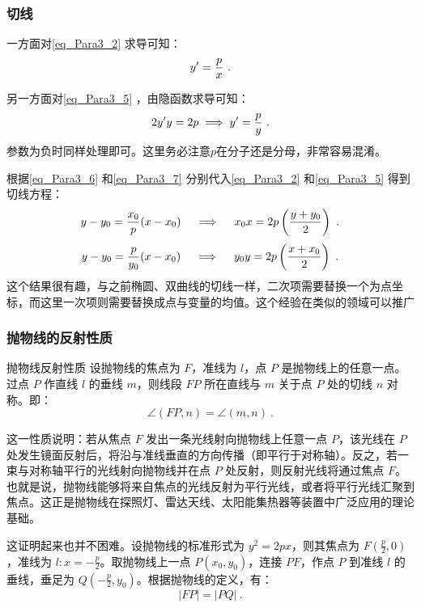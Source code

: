 \subsubsection{切线}

一方面对\autoref{eq_Para3_2} 求导可知：
\begin{equation}\label{eq_Para3_6}
y'={p\over x}~.
\end{equation}

另一方面对\autoref{eq_Para3_5} ，由隐函数求导可知：
\begin{equation}\label{eq_Para3_7}
2y'y=2p\implies y'={p\over y}~.
\end{equation}
参数为负时同样处理即可。这里务必注意$p$在分子还是分母，非常容易混淆。

根据\autoref{eq_Para3_6} 和\autoref{eq_Para3_7} 分别代入\autoref{eq_Para3_2} 和\autoref{eq_Para3_5} 得到切线方程：
\begin{equation}
y-y_0={x_0\over p}(x-x_0)\quad\implies\quad x_0x=2p\left(\frac{y+y_0}{2}\right)~.
\end{equation}
\begin{equation}
y-y_0={p\over y_0}(x-x_0)\quad\implies\quad y_0y=2p\left(\frac{x+x_0}{2}\right)~.
\end{equation}
这个结果很有趣，与之前椭圆、双曲线的切线一样，二次项需要替换一个为点坐标，而这里一次项则需要替换成点与变量的均值。这个经验在类似的领域可以推广

\subsubsection{抛物线的反射性质}

\begin{theorem}{抛物线反射性质}
设抛物线的焦点为 $F$，准线为 $l$，点 $P$ 是抛物线上的任意一点。过点 $P$ 作直线 $l$ 的垂线 $m$，则线段 $FP$ 所在直线与 $m$ 关于点 $P$ 处的切线 $n$ 对称。即：
\begin{equation}
\angle(FP, n) = \angle(m, n)~.
\end{equation}
\end{theorem}

这一性质说明：若从焦点 $F$ 发出一条光线射向抛物线上任意一点 $P$，该光线在 $P$ 处发生镜面反射后，将沿与准线垂直的方向传播（即平行于对称轴）。反之，若一束与对称轴平行的光线射向抛物线并在点 $P$ 处反射，则反射光线将通过焦点 $F$。也就是说，抛物线能够将来自焦点的光线反射为平行光线，或者将平行光线汇聚到焦点。这正是抛物线在探照灯、雷达天线、太阳能集热器等装置中广泛应用的理论基础。

这证明起来也并不困难。设抛物线的标准形式为 $y^2 = 2px$，则其焦点为 $\displaystyle F\left(\frac{p}{2}, 0\right)$，准线为 $\displaystyle l: x = -\frac{p}{2}$。取抛物线上一点 $P(x_0, y_0)$，连接 $PF$，作点 $P$ 到准线 $l$ 的垂线，垂足为 $\displaystyle Q\left(-\frac{p}{2}, y_0\right)$。根据抛物线的定义，有：
\begin{equation}
|FP| = |PQ|~.
\end{equation}

